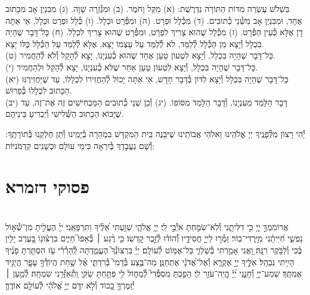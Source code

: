 \documentclass[twoside, openany, parskip=half, 11pt]{book}
\begin{document}
בִּשְׁלֹשׁ עֶשְׂרֵה מִדּוֹת הַתּוֹרָה נִדְרֶשֶׁת:\hfill \break
(א) מִקַּל וָחֹמֶר.\hfill \break
(ב) וּמִגְּ֯זֵרָה שָׁוָה.\hfill \break
(ג) מִבִּנְיַן אָב מִכָּתוּב אֶחָד, וּמִבִּנְיַן אָב מִשְּׁ֯נֵי כְ֯תוּבִים.\hfill \break
(ד) מִכְּ֯לָל וּפְרָט.\hfill \break
(ה) וּמִפְּ֯רָט וּכְלָל.\hfill \break
(ו) כְּ֯לָל וּפְרָט וּכְלָל, אֵי אַתָּה דָן אֶלָּא כְּ֯עֵין הַפְּ֯רָט.\hfill \break
(ז) מִכְּ֯לָל שֶׁהוּא צָרִיךְ לִפְרָט, וּמִפְּ֯רָט שֶׁהוּא צָרִיךְ לִכְלָל.\hfill \break
(ח) כָּל־דָּבָר שֶׁהָיָה בִּכְלָל וְ֯יָצָא מִן הַכְּ֯לָל לְ֯לַמֵּד, לֹא לְ֯לַמֵּד עַל עַצְמוֹ יָצָא, אֶלָּא לְ֯לַמֵּד עַל הַכְּ֯לָל כֻּלּוֹ יָצָא. \\
(ט) כָּל־דָּבָר שֶׁהָיָה בִּכְלָל, וְ֯יָצָא לִטְעוֹן טַעַן אֶחָד שֶׁהוּא כְ֯עִנְיָנוֹ, יָצָא לְ֯הָקֵל וְ֯לֹא לְ֯הַחֲמִיר. \\
(י) כָּל־דָּבָר שֶׁהָיָה בִּכְלָל, וְ֯יָצָא לִטְעוֹן טַעַן אַחֵר שֶׁלֹּא כְ֯עִנְיָנוֹ, יָצָא לְ֯הָקֵל וּלְהַחֲמִיר. \\
(יא) כָּל־דָּבָר שֶׁהָיָה בִּכְלָל וְ֯יָצָא לִדּוֹן בְּ֯דָבָר חָדָשׁ, אֵי אַתָּה יָכוֹל לְ֯הַחֲזִירוֹ לִכְלָלוֹ, עַד שֶׁיַּחֲזִירֶנּוּ הַכָּתוּב לִכְלָלוֹ בְּ֯פֵרוּשׁ. \\
(יב) דָּבָר הַלָּמֵד מֵעִנְיָנוֹ, וְ֯דָבָר הַלָּמֵד מִסּוֹפוֹ.\hfill \break
(יג) וְ֯כֵן שְׁנֵי כְ֯תוּבִים הַמַּכְחִישִׁים זֶה אֶת־זֶה, עַד שֶׁיָּבוֹא הַכָּתוּב הַשְּׁ֯לִישִׁי וְ֯יַכְרִיעַ בֵּינֵיהֶם.

יְ֯הִי רָצוֹן מִלְּ֯פָנֶֽיךָ יְיָ אֱלֹהֵֽינוּ וֵאלֹהֵי אֲבוֹתֵֽינוּ שֶׁיִּבָּנֶה בֵּית הַמִּקְדָּשׁ בִּמְהֵרָה בְ֯יָמֵֽינוּ וְ֯תֵן חֶלְקֵֽנוּ בְּ֯תוֹרָתֶֽךָ: וְ֯שָׁם נַעֲבׇדְךָ בְּ֯יִרְאָה כִּימֵי עוֹלָם וּכְשָׁנִים קַדְמֹנִיּוֹת:


\rabbiskaddish

\chapter[פסוקי דזמרא]{ פסוקי דזמרא }
  \\
אֲרוֹמִמְךָ֣ יְיָ֭ כִּ֣י דִלִּיתָ֑נִי וְ֯לֹֽא־שִׂמַּ֖חְתָּ אֹיְ֯בַ֣י לִֽי׃
יְיָ֥ אֱלֹהָ֑י \hfill שִׁוַּ֥עְתִּי אֵ֝לֶ֗יךָ וַתִּרְפָּאֵֽנִי׃
יְיָ֗ הֶעֱלִ֣יתָ מִן־שְׁ֯א֣וֹל נַפְשִׁ֑י חִ֝יִּיתַ֗נִי מִיׇּֽרְדִי־בֽוֹר׃
זַמְּ֯ר֣וּ לַייָ֣ חֲסִידָ֑יו וְ֯֝הוֹד֗וּ לְ֯זֵ֣כֶר קׇדְשֽׁוֹ׃
כִּ֤י רֶ֨גַע ׀ בְּ֯אַפּוֹ֮ חַיִּ֢ים בִּרְצ֫וֹנ֥וֹ
בָּ֭עֶרֶב יָלִ֥ין בֶּ֗כִי וְ֯לַבֹּ֥קֶר רִנָּֽה׃
וַ֭אֲנִי אָמַ֣רְתִּי בְ֯שַׁלְוִ֑י בַּל־אֶמּ֥וֹט לְ֯עוֹלָֽם׃
יְיָ֗ בִּרְצוֹנְ֯ךָ֮ הֶעֱמַ֢דְתָּה לְֽ֯הַרְ֯רִ֫י עֹ֥ז הִסְתַּ֥רְתָּ פָנֶ֗יךָ הָיִ֥יתִי נִבְהָֽל׃
אֵלֶ֣יךָ יְיָ֣ אֶקְרָ֑א וְ֯אֶל־אֲ֝דֹנָ֗י אֶתְחַנָּֽן׃
מַה־בֶּ֥צַע בְּ֯דָמִי֮ בְּ֯רִדְתִּ֢י אֶ֫ל שָׁ֥חַת הֲיוֹדְ֯ךָ֥ עָפָ֑ר הֲיַגִּ֥יד אֲמִתֶּֽךָ׃
שְׁמַע־יְיָ֥ וְ֯חׇנֵּ֑נִי יְ֝יָ֗ הֱֽיֵה־עֹזֵ֥ר לִֽי׃
הָפַ֣כְתָּ מִסְפְּ֯דִי֮ לְ֯מָח֢וֹל לִ֥י פִּתַּ֥חְתָּ שַׂקִּ֑י וַֽתְּ֯אַזְּ֯רֵ֥נִי שִׂמְחָֽה׃
לְ֯מַ֤עַן ׀ יְ֯זַמֶּרְךָ֣ כָ֭בוֹד וְ֯לֹ֣א יִדֹּ֑ם יְיָ֥ אֱ֝לֹהַ֗י לְ֯עוֹלָ֥ם אוֹדֶֽךָּ׃\\
\mournerskaddish
\end{document}

